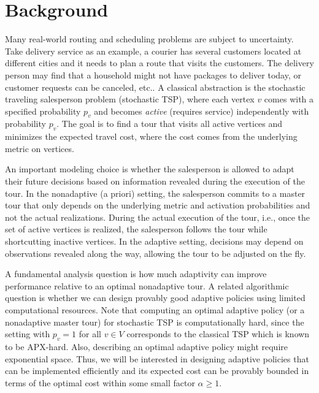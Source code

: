 \documentclass[12pt]{amsart}
\begin{document}
\maketitle

\section{Background}
Many real-world routing and scheduling problems are subject to uncertainty. Take delivery service as an example, a courier has several customers located at different cities and it needs to plan a route that visits the customers. The delivery person may find that 
a household might not have packages to deliver today, or customer requests can be canceled, etc..
A classical abstraction is the stochastic
traveling salesperson problem (stochastic TSP), where each vertex $v$ comes with a specified probability $p_v$ and becomes \textit{active} (requires service) independently with probability $p_v$. The goal is to find a tour that visits all active vertices and minimizes the expected travel cost, where the cost comes from the underlying metric on vertices.

An important modeling choice is whether the salesperson is allowed to adapt their future decisions based on information revealed during the execution of the tour. In the nonadaptive (a priori) setting, the salesperson commits to a master tour that only depends on the underlying metric and activation probabilities and not the actual realizations. During the actual execution of the tour, i.e., once the set of active vertices is realized, the salesperson follows the tour while shortcutting inactive vertices. In the adaptive setting, decisions may depend on observations revealed along the way, allowing the tour to be adjusted on the fly. 

A fundamental analysis question is how much adaptivity can improve performance relative to an optimal nonadaptive tour.
A related algorithmic question is whether we can design provably good adaptive policies using limited computational resources.
Note that computing an optimal adaptive policy (or a nonadaptive master tour) for stochastic TSP is computationally hard, since the setting with $p_v = 1$ for all $v \in V$ corresponds to the classical TSP which is known to be APX-hard\cite{Karpinski2015}. 
Also, describing an optimal adaptive policy might require exponential space. 
Thus, we will be interested in designing adaptive policies that can be implemented efficiently 
and its expected cost can be provably bounded in terms of the optimal cost within some small factor $\alpha \geq 1$.  
\end{document}
